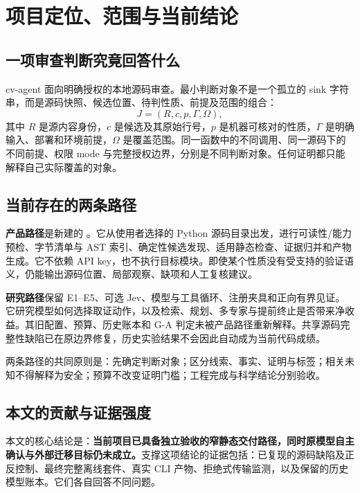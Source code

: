 \section{项目定位、范围与当前结论}
\label{sec:scope}
\subsection{一项审查判断究竟回答什么}
cv-agent 面向明确授权的本地源码审查。最小判断对象不是一个孤立的 sink 字符串，而是源码快照、候选位置、待判性质、前提及范围的组合：
\begin{equation}
J=(R,c,p,\Gamma,\Omega),
\end{equation}
其中 $R$ 是源内容身份，$c$ 是候选及其原始行号，$p$ 是机器可核对的性质，$\Gamma$ 是明确输入、部署和环境前提，$\Omega$ 是覆盖范围。同一函数中的不同调用、同一源码下的不同前提、权限 mode 与完整授权边界，分别是不同判断对象。任何证明都只能解释自己实际覆盖的对象。\cite{contract}

\subsection{当前存在的两条路径}
\textbf{产品路径}是新建的 。它从使用者选择的 Python 源码目录出发，进行可读性/能力预检、字节清单与 AST 索引、确定性候选发现、适用静态检查、证据归并和产物生成。它不依赖 API key，也不执行目标模块。即使某个性质没有受支持的验证语义，仍能输出源码位置、局部观察、缺项和人工复核建议。

\textbf{研究路径}保留 E1--E5、可选 Jev、模型与工具循环、注册夹具和正向有界见证。它研究模型如何选择取证动作，以及检索、规划、多专家与提前终止是否带来净收益。其旧配置、预算、历史账本和 G-A 判定未被产品路径重新解释。共享源码完整性缺陷已在原边界修复，历史实验结果不会因此自动成为当前代码成绩。

两条路径的共同原则是：先确定判断对象；区分线索、事实、证明与标签；相关未知不得解释为安全；预算不改变证明门槛；工程完成与科学结论分别验收。

\subsection{本文的贡献与证据强度}
本文的核心结论是：\textbf{当前项目已具备独立验收的窄静态交付路径，同时原模型自主确认与外部迁移目标仍未成立。}支撑这项结论的证据包括：已复现的源码缺陷及正反控制、最终完整离线套件、真实 CLI 产物、拒绝式传输监测，以及保留的历史模型账本。它们各自回答不同问题。

